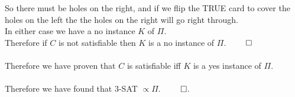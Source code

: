 \documentclass{article}
\begin{document}
      So there must be holes on the right, and if we flip the TRUE card to cover the holes on the left the the holes on the right will go right through.\\
      In either case we have a no instance $K$ of $\Pi$.\\
      Therefore if $C$ is not satisfiable then $K$ is a no instance of $\Pi$. $\qed$\\
      \\
      Therefore we have proven that $C$ is satisfiable iff $K$ is a yes instance of $\Pi$.\\
      \\
      Therefore we have found that 3-SAT $\propto \Pi$. $\qed$.
\end{document}
